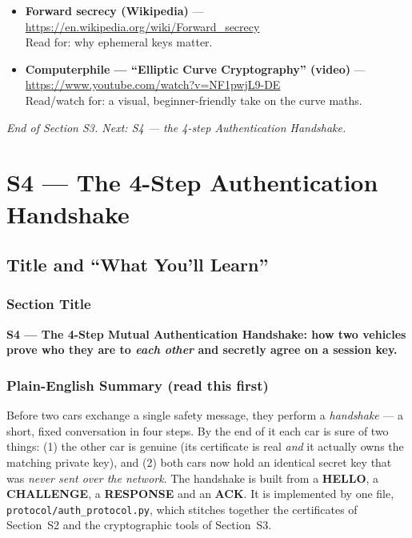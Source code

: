\documentclass[11pt,a4paper]{report}
\begin{document}
\begin{itemize}
        \url{https://en.wikipedia.org/wiki/Galois/Counter_Mode}\\
        Read for: how the GCM tag is built.
  \item \textbf{Forward secrecy (Wikipedia)} ---
        \url{https://en.wikipedia.org/wiki/Forward_secrecy}\\
        Read for: why ephemeral keys matter.
  \item \textbf{Computerphile --- ``Elliptic Curve Cryptography'' (video)} ---
        \url{https://www.youtube.com/watch?v=NF1pwjL9-DE}\\
        Read/watch for: a visual, beginner-friendly take on the curve maths.
\end{itemize}

\vfill
\begin{center}\footnotesize\itshape
End of Section S3. Next: S4 --- the 4-step Authentication Handshake.
\end{center}



\chapter{S4 --- The 4-Step Authentication Handshake}

\section{Title and ``What You'll Learn''}

\subsection*{Section Title}
\textbf{S4 --- The 4-Step Mutual Authentication Handshake: how two vehicles
prove who they are to \emph{each other} and secretly agree on a session key.}

\subsection*{Plain-English Summary (read this first)}
Before two cars exchange a single safety message, they perform a
\emph{handshake} --- a short, fixed conversation in four steps. By the end of it
each car is sure of two things: (1) the other car is genuine (its certificate is
real \emph{and} it actually owns the matching private key), and (2) both cars now
hold an identical secret key that was \emph{never sent over the network}. The
handshake is built from a \textbf{HELLO}, a \textbf{CHALLENGE}, a
\textbf{RESPONSE} and an \textbf{ACK}. It is implemented by one file,
\texttt{protocol/auth\_protocol.py}, which stitches together the certificates of
Section~S2 and the cryptographic tools of Section~S3.
\end{document}

